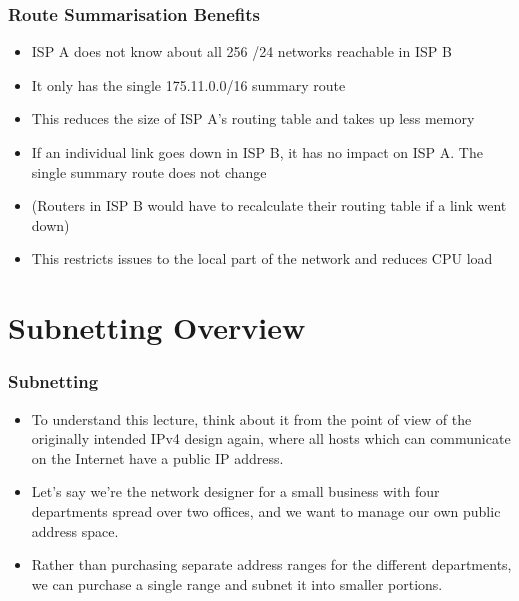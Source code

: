 \documentclass[pdflatex,compress]{beamer}
\begin{document}
\begin{frame}
	\frametitle{Route Summarisation Benefits}
	\begin{itemize}
		\item ISP A does not know about all 256 /24 networks reachable in ISP B
		\item It only has the single 175.11.0.0/16 summary route
		\item This reduces the size of ISP A's routing table and takes up less memory
		\item If an individual link goes down in ISP B, it has no impact on ISP A. The single summary route does not change
		\item (Routers in ISP B would have to recalculate their routing table if a link went down)
		\item This restricts issues to the local part of the network and reduces CPU load
	\end{itemize}
\end{frame}

\section{Subnetting Overview}

\begin{frame}
	\frametitle{Subnetting}
	\begin{itemize}
		\item To understand this lecture, think about it from the point of view of the originally intended IPv4 design again, where all hosts which can communicate on the Internet have a public IP address.
		\item Let's say we're the network designer for a small business with four departments spread over two offices, and we want to manage our own public address space.
		\item Rather than purchasing separate address ranges for the different departments, we can purchase a single range and subnet it into smaller portions.
	\end{itemize}
\end{frame}
\end{document}
